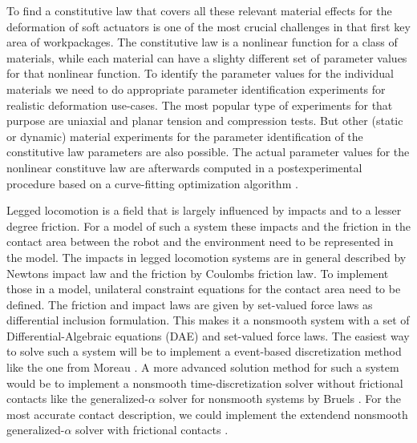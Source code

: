 \par
To find a constitutive law that covers all these relevant material effects for the deformation of soft actuators is one of the most crucial challenges in that first key area of workpackages.
 The constitutive law is a nonlinear function for a class of materials, while each material can have a slighty different set of parameter values for that nonlinear function. To identify the 
parameter values for the individual materials we need to do appropriate parameter identification experiments for realistic deformation use-cases. The most popular type of experiments 
for that purpose are uniaxial and planar tension and compression tests. But other (static or dynamic) material experiments for the parameter identification of the
constitutive law parameters are also possible.
The actual parameter values for the nonlinear constituve law are afterwards computed in a postexperimental procedure based on a curve-fitting optimization algorithm \cite{Gao2012}.
%
%
\par
Legged locomotion is a field that is largely influenced by impacts and to a lesser degree friction. For a model of such a system these impacts and the friction in the contact area between
the robot and the environment need to be represented in the model. The impacts in legged locomotion systems are in general described by 
Newtons impact law and the friction by Coulombs friction law. To implement those in a model, unilateral constraint equations for the contact area need to be defined. The friction
 and impact laws are given by set-valued force laws \cite{Glocker2001_book} as differential inclusion formulation. This makes it a nonsmooth system with a set of 
 Differential-Algebraic equations (DAE) and set-valued force laws. The easiest way to solve such a system will be to implement a event-based discretization method like the one from Moreau \cite{Moreau1988}.
A more advanced solution method for such a system would be to implement a nonsmooth time-discretization solver without frictional contacts like the generalized-$\alpha$ solver
 for nonsmooth systems  by Bruels \cite{Bruels2018}. For the most accurate contact description, we could implement the extendend nonsmooth generalized-$\alpha$ solver with frictional
contacts \cite{Capobianco2021}. 
%
%

